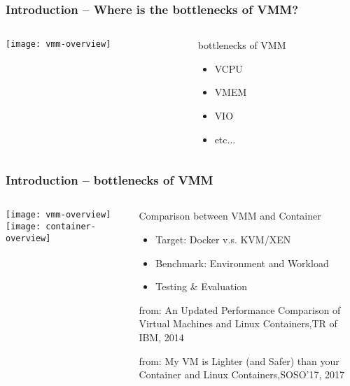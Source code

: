 \begin{frame}[plain]
	\frametitle{Introduction -- Where is the bottlenecks of VMM?}



	\begin{columns}

	\begin{column}{.4\textwidth}
	
	\texttt{[image: vmm-overview]}
	
	\end{column}

	\begin{column}{.6\textwidth}
	
	\Large
    bottlenecks of VMM	
	\begin{itemize}
	\item VCPU
	\item VMEM
	\item VIO
	\item  etc...
	\end{itemize}	


	\end{column}
	
    
\end{columns}


\end{frame}


\begin{frame}[plain]
	\frametitle{Introduction -- bottlenecks of VMM}
	
	
	
	\begin{columns}
		
		\begin{column}{.4\textwidth}
			\centering
			\texttt{[image: vmm-overview]}
			\texttt{[image: container-overview]}
		\end{column}
		
		\begin{column}{.6\textwidth}
			
			\Large
			Comparison between VMM and Container
			\begin{itemize}
				\item Target: Docker v.s. KVM/XEN 
				\item Benchmark: Environment and Workload
				\item Testing \& Evaluation

			\end{itemize}	
			
			\tiny from: An Updated Performance Comparison of Virtual Machines	and Linux Containers,TR of IBM, 2014
			
			\tiny from: My VM is Lighter (and Safer) than your Container and Linux Containers,SOSO'17, 2017
		\end{column}
		
		
	\end{columns}
	
	
\end{frame}


